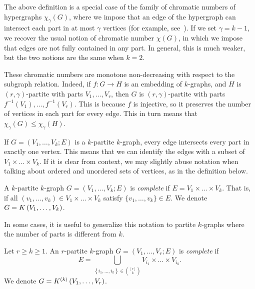 The above definition is a special case of the family of chromatic numbers of hypergraphs $\chi_{\gamma}(G)$,
where we impose that an edge of the hypergraph can intersect each part in at most $\gamma$ vertices
(for example, see~\cite{krivelevich1998chromatic}).
If we set $\gamma = k - 1$, we recover the usual notion of chromatic number $\chi(G)$,
in which we impose that edges are not fully contained in any part.
In general, this is much weaker, but the two notions are the same when $k = 2$.

\begin{remark}
    These chromatic numbers are monotone non-decreasing with respect to the subgraph relation.
    Indeed, if $f: G \to H$ is an embedding of $k$-graphs,
    and $H$ is $(r, \gamma)$-partite with parts $V_1, \dots, V_r$,
    then $G$ is $(r, \gamma)$-partite with parts $f^{-1}(V_1), \dots, f^{-1}(V_r)$.
    This is because $f$ is injective, so it preserves the number of vertices in each part for every edge.
    This in turn means that $\chi_{\gamma}(G) \leq \chi_{\gamma}(H)$.
\end{remark}

If $G = (V_1, \dots, V_k; E)$ is a $k$-partite $k$-graph,
every edge intersects every part in exactly one vertex.
This means that we can identify the edges with a subset of $ V_1 \times \dots \times V_k$.
If it is clear from context, we may slightly abuse notation when talking about ordered and
unordered sets of vertices, as in the definition below.


\begin{definition} \label{def:complete_kpartite}
    A $k$-partite $k$-graph $G = (V_1, \dots, V_k; E)$ is \emph{complete}
    if $E = V_1 \times \dots \times V_k$.
    That is, if all $(v_1, \dots, v_k) \in V_1 \times \dots \times V_k$
    satisfy $\{v_1, \dots, v_k\} \in E$.
    We denote $G = K\left(V_1, \dots, V_k\right)$.
\end{definition}

In some cases, it is useful to generalize this notation to partite $k$-graphs
where the number of parts is different from $k$.

\begin{definition}
    Let $r \geq k \geq 1$.
    An $r$-partite $k$-graph $G = (V_1, \dots, V_r; E)$ is \emph{complete} if
    \[
        E = \bigcup_{\left\{i_1, \dots, i_k \right\} \in \binom{[r]}{k}} V_{i_1} \times \dots \times V_{i_k}.
    \]
    We denote $G = K^{(k)}\left(V_1, \dots, V_r\right)$.

\end{definition}

